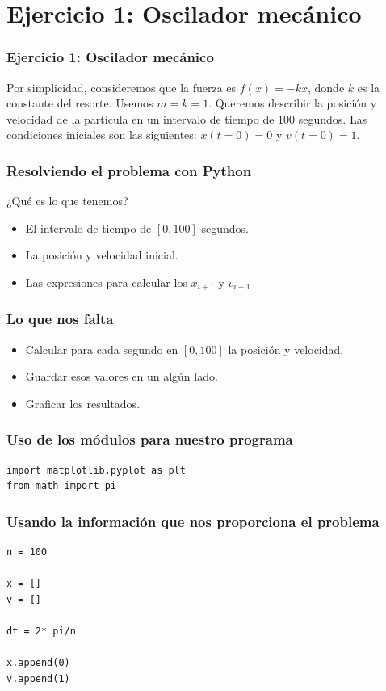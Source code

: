 \section{Ejercicio 1: Oscilador mec\'{a}nico}
\begin{frame}
\frametitle{Ejercicio 1: Oscilador mec\'{a}nico}
Por simplicidad, consideremos que la fuerza es $f(x) = -kx$, donde $k$ es la constante del resorte. Usemos $m=k=1$. Queremos describir la posici\'{o}n y velocidad de la part\'{i}cula en un intervalo de tiempo de 100 segundos. Las condiciones iniciales son las siguientes: $x(t=0) = 0$ y $v(t=0) = 1$.
\end{frame}
\begin{frame}[<+->]
\frametitle{Resolviendo el problema con Python}
¿Qu\'{e} es lo que tenemos?
\begin{itemize}
\item El intervalo de tiempo de $[0,100]$ segundos.
\item La posici\'{o}n y velocidad inicial.
\item Las expresiones para calcular los $x_{i+1}$ y $v_{i+1}$
\end{itemize}
\end{frame}
\begin{frame}[fragile]
\frametitle{Lo que nos falta}
\begin{itemize}[<+->]
\item Calcular para cada segundo en $[0,100]$ la posici\'{o}n y velocidad.
\item Guardar esos valores en un alg\'{u}n lado.
\item Graficar los resultados.
\end{itemize}
\end{frame}
\begin{frame}[fragile]
\frametitle{Uso de los m\'{o}dulos para nuestro programa}
\begin{lstlisting}
import matplotlib.pyplot as plt
from math import pi
\end{lstlisting}
\end{frame}
\begin{frame}[fragile]
\frametitle{Usando la informaci\'{o}n que nos proporciona el problema}
\begin{lstlisting}
n = 100

x = []
v = []

dt = 2* pi/n

x.append(0)
v.append(1)
\end{lstlisting}
\end{frame}
